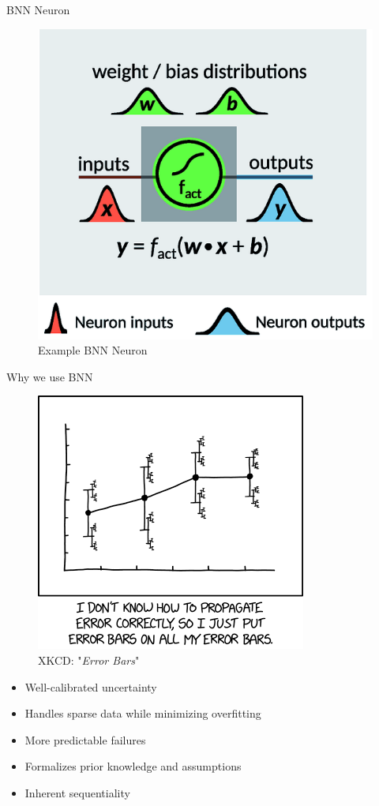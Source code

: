 \documentclass{beamer}
\begin{document}
\begin{frame}{BNN Neuron}
	\begin{figure}
		\includegraphics[width=.55\textwidth]{../Images/BNN-neuron.png}
		\caption{Example BNN Neuron \cite{hase2019machine}}
	\end{figure}
\end{frame}

\begin{frame}{Why we use BNN}
	\begin{multicols}{2}
		\begin{figure}
			\includegraphics[width=.45\textwidth]{../Images/xkcd_error_bars.png}
			\caption{XKCD: "\textit{Error Bars}" \cite{xkcd-self-driving}}
		\end{figure}
		
		\columnbreak
		
		\null \vfill
		\begin{itemize}
			\item Well-calibrated uncertainty
			\item Handles sparse data while minimizing overfitting
			\item More predictable failures
			\item Formalizes prior knowledge and assumptions
			\item Inherent sequentiality
		\end{itemize}
		\vfill \null
	\end{multicols}
\end{frame}
\end{document}

